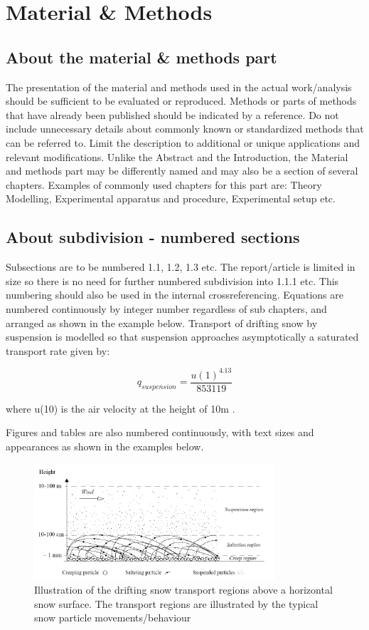 \documentclass[a4paper,12pt]{extarticle}
\begin{document}
\section{Material \& Methods}
\subsection{About the material \& methods part}
The presentation of the material and methods used in the actual work/analysis should be sufficient to be evaluated or reproduced. Methods or parts of methods that have already been published should be indicated by a reference. Do not include unnecessary details about commonly known or standardized methods that can be referred to. Limit the description to additional or unique applications and relevant modifications. Unlike the Abstract and the Introduction, the Material and methods part may be differently named and may also be a section of several chapters. Examples of commonly used chapters for this part are: Theory Modelling, Experimental apparatus and procedure, Experimental setup etc.

\subsection{About subdivision - numbered sections}
Subsections are to be numbered 1.1, 1.2, 1.3 etc. The report/article is limited in size so there is no need for further numbered subdivision into 1.1.1 etc. This numbering should also be used in the internal crossreferencing. Equations are numbered continuously by integer number regardless of sub chapters, and arranged as shown in the example below. Transport of drifting snow by suspension is modelled so that suspension approaches asymptotically a saturated transport rate given by:

\begin{equation}
  q_{suspension} = \frac{u(1)^{4.13}}{853119}
  \label{eq:FirstEquation}
\end{equation}

where u(10) is the air velocity at the height of 10m \citet{Tabler1990}.

Figures and tables are also numbered continuously, with text sizes and appearances as shown in the examples below. 

\begin{figure}[H]
  \centering
  \includegraphics[width=0.8\textwidth]{SnowTransport.png}
  \caption{Illustration of the drifting snow transport regions above a horizontal snow surface. The transport regions are illustrated by the typical snow particle movements/behaviour \citet{Sundsbo1997}}
  \label{fig:SnowTransport}
\end{figure}
\end{document}

